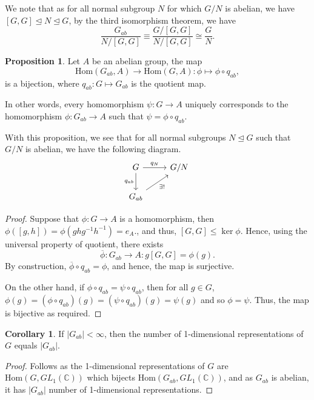 \documentclass[]{article}
\theoremstyle{definition}
\newtheorem{corollary}{Corollary}[theorem]
\theoremstyle{definition}
\newtheorem{proposition}{Proposition}[section]
\begin{document}
We note that as for all normal subgroup \(N\) for which \(G / N\) is 
abelian, we have \([G, G] \trianglelefteq N \trianglelefteq G\), by the third
isomorphism theorem, we have 
\[\frac{G_{ab}}{N / [G, G]} \equiv \frac{G / [G, G]}{N / [G, G]} \cong \frac{G}{N}.\]

\begin{proposition}
  Let \(A\) be an abelian group, the map 
  \[\text{Hom}(G_{ab}, A) \to \text{Hom}(G, A) : \phi \mapsto \phi \circ q_{ab},\]
  is a bijection, where \(q_{ab} : G \mapsto G_{ab}\) is the quotient map. 

  In other words, every homomorphism \(\psi : G \to A\) uniquely corresponds to 
  the homomorphism \(\phi : G_{ab} \to A\) such that \(\psi = \phi \circ q_{ab}\).
\end{proposition}

With this proposition, we see that for all normal subgroups \(N \trianglelefteq G\) 
such that \(G / N\) is abelian, we have the following diagram.
\[\begin{tikzcd}
  G \arrow{r}{q_N} \arrow[swap]{d}{q_{ab}} & G / N \\
  G_{ab} \arrow[swap]{ur}{\exists!}
  \end{tikzcd}\]

\begin{proof}
  Suppose that \(\phi : G \to A\) is a homomorphism, then 
  \(\phi([g, h]) = \phi(ghg^{-1}h^{-1}) = e_A.\), and thus, 
  \([G, G] \le \ker \phi\). Hence, using the universal property of quotient, 
  there exists \[\overline{\phi} : G_{ab} \to A : g[G, G] = \phi(g).\] 
  By construction, \(\overline{\phi} \circ q_{ab} = \phi\), and hence, 
  the map is surjective.

  On the other hand, if \(\phi \circ q_{ab} = \psi \circ q_{ab}\), then for all 
  \(g \in G\), \(\phi(g) = (\phi \circ q_{ab})(g) = (\psi \circ q_{ab})(g) = \psi(g)\) 
  and so \(\phi = \psi\). Thus, the map is bijective as required.
\end{proof}

\begin{corollary}
  If \(|G_{ab}| < \infty\), then the number of 1-dimensional representations of 
  \(G\) equals \(|G_{ab}|\).
\end{corollary}
\begin{proof}
  Follows as the 1-dimensional representations of \(G\) are 
  \(\text{Hom}(G, GL_1(\mathbb{C}))\) which bijects 
  \(\text{Hom}(G_{ab}, GL_1(\mathbb{C}))\), and as \(G_{ab}\) is abelian, 
  it has \(|G_{ab}|\) number of 1-dimensional representations.
\end{proof}
\end{document}
